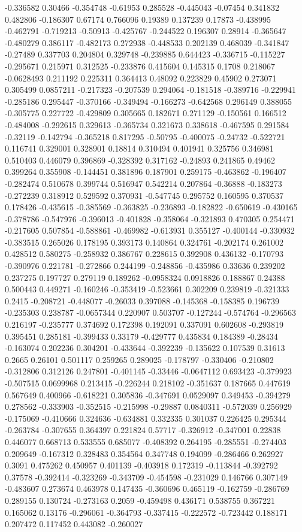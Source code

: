 -0.336582 0.30466 -0.354748 -0.61953 0.285528 -0.445043 -0.07454 0.341832 0.482806 -0.186307 0.67174 0.766096 0.19389 0.137239 0.17873 -0.438995 -0.462791 -0.719213 -0.50913 -0.425767 -0.244522 0.196307 0.28914 -0.365647 -0.480279 0.386117 -0.482173 0.272938 -0.448533 0.202139 0.468039 -0.341847 -0.27489 0.337703 0.204804 0.329748 -0.239885 0.644423 -0.336715 -0.115227 -0.295671 0.215971 0.312525 -0.233876 0.415604 0.145315 0.1708 0.218067 -0.0628493 0.211192 0.225311 0.364413 0.48092 0.223829 0.45902 0.273071 0.305499 0.0857211 -0.217323 -0.207539 0.294064 -0.181518 -0.389716 -0.229941 -0.285186 0.295447 -0.370166 -0.349494 -0.166273 -0.642568 0.296149 0.388055 -0.305775 0.227722 -0.429809 0.305665 0.182671 0.271129 -0.150561 0.166512 -0.484008 -0.292615 0.329613 -0.365734 0.321673 0.338618 -0.467595 0.291584 -0.32119 -0.142794 -0.365218 0.817295 -0.50795 -0.400075 -0.24732 -0.522721 0.116741 0.329001 0.328901 0.18814 0.310494 0.401941 0.325756 0.346981 0.510403 0.446079 0.396869 -0.328392 0.317162 -0.24893 0.241865 0.49462 0.399264 0.355908 -0.144451 0.381896 0.187901 0.259175 -0.463862 -0.196407 -0.282474 0.510678 0.399744 0.516947 0.542214 0.207864 -0.36888 -0.183273 -0.272239 0.318912 0.529592 0.370931 -0.547745 0.295752 0.160595 0.370537 0.178426 -0.435615 -0.385569 -0.363825 -0.236893 -0.182822 -0.650619 -0.430165 -0.378786 -0.547976 -0.396013 -0.401828 -0.358064 -0.321893 0.470305 0.254471 -0.217605 0.507854 -0.588861 -0.469982 -0.613931 0.355127 -0.400144 -0.330932 -0.383515 0.265026 0.178195 0.393173 0.140864 0.324761 -0.202174 0.261002 0.428512 0.580275 -0.258932 0.386767 0.228615 0.392908 0.436132 -0.170793 -0.390976 0.221781 -0.272866 0.244199 -0.248856 -0.435986 0.33636 0.239202 0.237275 0.197727 0.279119 0.189262 -0.0958324 0.0918826 0.188867 0.24388 0.500443 0.449271 -0.160246 -0.353419 -0.523661 0.302209 0.239819 -0.321333 0.2415 -0.208721 -0.448077 -0.26033 0.397088 -0.145368 -0.158385 0.196739 -0.235303 0.238787 -0.0657344 0.220907 0.503707 -0.127244 -0.574764 -0.296563 0.216197 -0.235777 0.374692 0.172398 0.192091 0.337091 0.602608 -0.293819 0.395451 0.285181 -0.399433 0.33179 -0.429777 0.435834 0.184389 -0.28434 -0.163074 0.202236 0.304201 -0.433644 -0.392239 -0.135622 0.107539 0.31613 0.2665 0.26101 0.501117 0.259265 0.289025 -0.178797 -0.330406 -0.210802 -0.312806 0.312126 0.247801 -0.401145 -0.33446 -0.0647112 0.693423 -0.379923 -0.507515 0.0699968 0.213415 -0.226244 0.218102 -0.351637 0.187665 0.447619 0.567649 0.400966 -0.618221 0.305836 -0.347691 0.0529097 0.349453 -0.394279 0.278562 -0.333903 -0.352515 -0.215998 -0.29887 0.0840311 -0.572039 0.256929 -0.175069 -0.410666 0.324636 -0.634881 0.332335 0.301037 0.226425 0.295344 -0.263784 -0.307655 0.364397 0.221824 0.57717 -0.326912 -0.347001 0.22838 0.446077 0.668713 0.533555 0.685077 -0.408392 0.264195 -0.285551 -0.274403 0.209649 -0.167312 0.328483 0.354564 0.347748 0.194099 -0.286466 0.262927 0.3091 0.475262 0.450957 0.401139 -0.403918 0.172319 -0.113844 -0.392792 0.37578 -0.392414 -0.323269 -0.343709 -0.454598 -0.231029 0.146766 0.307149 -0.483607 0.273674 0.463978 0.147435 -0.360696 0.465119 -0.162759 -0.286769 0.289155 0.130724 -0.273163 0.2059 -0.459498 0.436171 0.538755 0.367221 0.165062 0.13176 -0.296061 -0.364793 -0.337415 -0.222572 -0.723442 0.188171 0.207472 0.117452 0.443082 -0.260027 